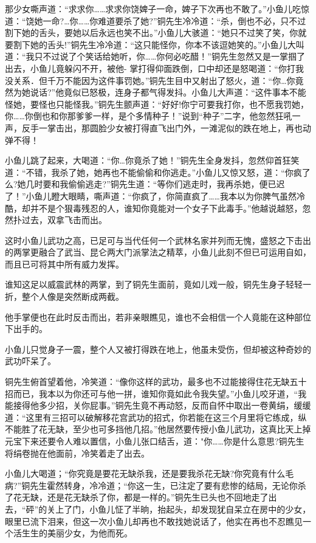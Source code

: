 \documentclass[12pt,oneside]{book}
\begin{document}
那少女嘶声道：``求求你\ldots\ldots 求求你饶婢子一命，婢子下次再也不敢了。''小鱼儿吃惊道：``饶她一命?\ldots 你\ldots\ldots 你难道要杀了她?''铜先生冷冷道：``杀，倒也不必，只不过割下她的舌头，要她以后永远也笑不出。''小鱼儿大骇道：``她只不过笑了笑，你就要割下她的舌头!''铜先生冷冷道：``这只能怪你，你本不该逗她笑的。''小鱼儿大叫道：``我只不过说了个笑话给她听，你\ldots\ldots 你何必吃醋！''铜先生忽然又是一掌掴了出去，小鱼儿竟躲闪不开，被他-
掌打得仰面跌倒，口中却还是怒喝道：``你打我没关系．但千万不能因为这件事罚她。''铜先生目中又射出了怒火，道：``你\ldots 你竟然为她说话?''他竟似已怒极，连身子都气得发抖。小鱼儿大声道：``这件事本不能怪她，要怪也只能怪我。''铜先生颤声道：``好好!你宁可要我打你，也不愿我罚她，你\ldots\ldots 你倒也和你那爹爹一样，是个多情种子！''说到``种子''二字，他忽然狂吼一声，反手一掌击出，那圆脸少女被打得直飞出门外，一滩泥似的跌在地上，再也动弹不得！

小鱼儿跳了起来，大喝道：``你\ldots 你竟杀了她！''铜先生全身发抖，忽然仰首狂笑道：``不错，我杀了她，她再也不能偷偷和你逃走。''小鱼儿又惊又怒，道：``你疯了么?她几时要和我偷偷逃走?''铜先生道：``等你们逃走时，我再杀她，便已迟了！''小鱼儿瞪大眼睛，嘶声道：``你疯了，你简直疯了\ldots\ldots 我本以为你脾气虽然冷酷，却并不是个狠毒残忍的人，谁知你竟能对一个女子下此毒手。''他越说越怒，忽然扑过去，双拿飞击而出。

这时小鱼儿武功之高，已足可与当代任何一个武林名家并列而无愧，盛怒之下击出的两掌更融合了武当、昆仑两大门派掌法之精萃，小鱼儿此刻不但已可运用自如，而且已可将其中所有威力发挥。

谁知这足以威震武林的两掌，到了铜先生面前，竟如儿戏一般，铜先生身子轻轻一折，整个人像是突然断成两截。

他手掌便也在此时反击而出，若非亲眼瞧见，谁也不会相信一个人竟能在这种部位下出手的。

小鱼儿只觉身子一震，整个人又被打得跌在地上，他虽未受伤，但却被这种奇妙的武功吓呆了。

铜先生俯首望着他，冷笑道：``像你这样的武功，最多也不过能接得住花无缺五十招而已，我本以为你还可与他一拼，谁知你竟如此令我失望。''小鱼儿咬牙道，``我能接得他多少招，关你屁事。''铜先生竟不再动怒，反而自怀中取出一卷黄绢，缓缓道：``这里有三招可以破解移花宫武功的招式，你若能在这三个月里将它练成，纵不能胜了花无缺，至少也可多挡他几招。''他居然要传授小鱼儿武功，这真比天上掉元宝下来还要令人难以置信，小鱼儿张口结舌，道："你\ldots\ldots 你是什么意思?铜先生将绢卷抛在他面前，冷笑着走了出去。

小鱼儿大喝道；``你究竟是要花无缺杀我，还是要我杀花无缺?你究竟有什么毛病?''铜先生霍然转身，冷冷道；``你这一生，已注定了要有悲惨的结局，无论你杀了花无缺，还是花无缺杀了你，都是一样的。''铜先生已头也不回地走了出去，``砰''的关上了门，小鱼儿怔了半晌，抬起头，却发现犹自呆立在房中的少女，眼里已流下泪来，但这一次小鱼儿却再也不敢找她说话了，他实在再也不忍瞧见一个活生生的美丽少女，为他而死。
\end{document}
